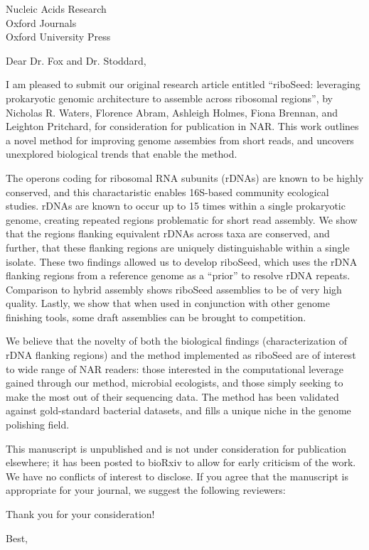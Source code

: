 \documentclass[12pt]{letter}
\begin{document}
\begin{letter}{ Nucleic Acids Research  \\  Oxford Journals  \\  Oxford University Press }

\opening{Dear Dr. Fox and Dr. Stoddard,} %

I am pleased to submit our original research article entitled ``riboSeed: leveraging prokaryotic genomic architecture to assemble across ribosomal regions'', by Nicholas R. Waters, Florence Abram, Ashleigh Holmes, Fiona Brennan, and Leighton Pritchard, for consideration for publication in NAR. This work outlines a  novel method for improving genome assembies from short reads, and uncovers unexplored biological trends that enable the method.

The operons coding for ribosomal RNA subunits (rDNAs) are known to be highly conserved, and this charactaristic enables 16S-based community ecological studies. rDNAs are known to occur up to 15 times within a single prokaryotic genome, creating repeated regions problematic for short read assembly. We show that the regions flanking equivalent rDNAs across taxa are conserved, and further, that these flanking regions are uniquely distinguishable within a single isolate. These two findings allowed us to develop riboSeed, which uses the rDNA flanking regions from a reference genome as a ``prior'' to resolve rDNA repeats. Comparison to hybrid assembly shows riboSeed assemblies to be of very high quality. Lastly, we show that when used in conjunction with other genome finishing tools, some draft assemblies can be brought to competition.

We believe that the novelty of both the biological findings (characterization of rDNA flanking regions) and the method implemented as riboSeed are of interest to wide range of NAR readers: those interested in the computational leverage gained through our method,  microbial ecologists, and those simply seeking to make the most out of their sequencing data.  The method has been validated against gold-standard bacterial datasets, and fills a unique niche in the genome polishing field.

This manuscript is unpublished and is not under consideration for publication elsewhere; it has been posted to bioRxiv to allow for early criticism of the work. We have no conflicts of interest to disclose. If you agree that the manuscript is appropriate for your journal, we suggest the following reviewers:

Thank you for your consideration!

\closing{Best,} %


\end{letter}
\end{document}
